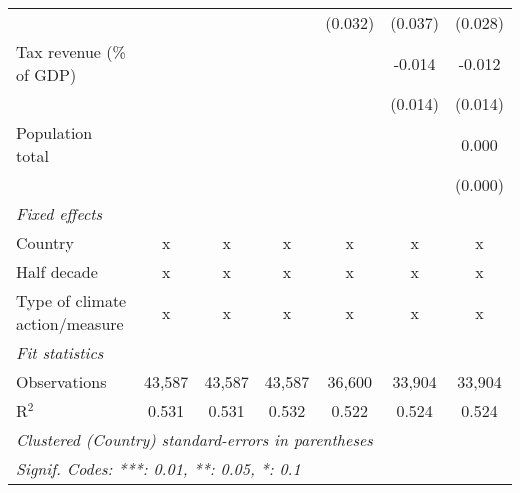 \begin{tabular}{lcccccc}
                                                            &         &              &               & (0.032)       & (0.037)       & (0.028)\\   
   Tax revenue (\% of GDP)                                  &         &              &               &               & -0.014        & -0.012\\   
                                                            &         &              &               &               & (0.014)       & (0.014)\\   
   Population total                                         &         &              &               &               &               & 0.000\\   
                                                            &         &              &               &               &               & (0.000)\\   
   \emph{Fixed effects}\\
   Country                                                  & x       & x            & x             & x             & x             & x\\  
   Half decade                                              & x       & x            & x             & x             & x             & x\\  
   Type of climate action/measure                           & x       & x            & x             & x             & x             & x\\  
   \midrule \emph{Fit statistics}\\
   Observations                                             & 43,587  & 43,587       & 43,587        & 36,600        & 33,904        & 33,904\\  
   R$^2$                                                    & 0.531   & 0.531        & 0.532         & 0.522         & 0.524         & 0.524\\  
   \midrule
   \multicolumn{7}{l}{\emph{Clustered (Country) standard-errors in parentheses}}\\
   \multicolumn{7}{l}{\emph{Signif. Codes: ***: 0.01, **: 0.05, *: 0.1}}\\
\end{tabular}
\par\endgroup


